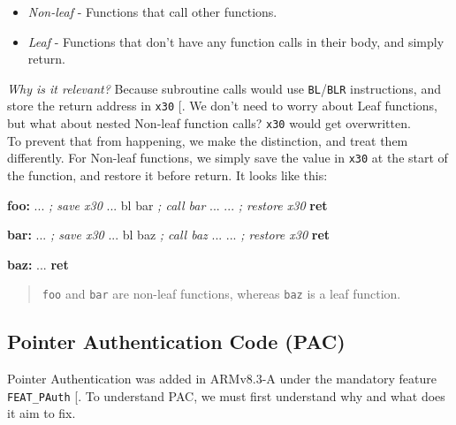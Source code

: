 \documentclass[a4paper, nobind]{templates/ociamthesis}
\providecommand{\tightlist}{%
  \setlength{\itemsep}{0pt}\setlength{\parskip}{0pt}}
\newenvironment{Shaded}{\begin{snugshade}}{\end{snugshade}}
\newcommand{\CommentTok}[1]{\textcolor[rgb]{0.56,0.35,0.01}{\textit{#1}}}
\newcommand{\ControlFlowTok}[1]{\textcolor[rgb]{0.13,0.29,0.53}{\textbf{#1}}}
\newcommand{\FunctionTok}[1]{\textcolor[rgb]{0.13,0.29,0.53}{\textbf{#1}}}
\newcommand{\NormalTok}[1]{#1}
\renewenvironment{Shaded}
{
  \vspace{10pt}%
  \begin{snugshade}%
}{%
  \end{snugshade}%
  \vspace{8pt}%
}
\begin{document}
\begin{itemize}
\tightlist
\item
  \emph{Non-leaf} - Functions that call other functions.
\item
  \emph{Leaf} - Functions that don't have any function calls in their body, and simply return.
\end{itemize}

\emph{Why is it relevant?}
Because subroutine calls would use \texttt{BL}/\texttt{BLR} instructions,
and store the return address in \texttt{x30} {[}\citeproc{ref-arm-arch-manual}{11}{]}.
We don't need to worry about Leaf functions,
but what about nested Non-leaf function calls? \texttt{x30} would get overwritten.\\
To prevent that from happening, we make the distinction, and treat them differently.
For Non-leaf functions, we simply save the value in \texttt{x30} at the start of the function,
and restore it before return. It looks like this:

\begin{Shaded}
\begin{Highlighting}[]
\FunctionTok{foo:}
\NormalTok{  ...     }\CommentTok{; save x30}
\NormalTok{  ...}
\NormalTok{  bl bar  }\CommentTok{; call bar}
\NormalTok{  ...}
\NormalTok{  ...     }\CommentTok{; restore x30}
  \ControlFlowTok{ret}

\FunctionTok{bar:}
\NormalTok{  ...     }\CommentTok{; save x30}
\NormalTok{  ...}
\NormalTok{  bl baz  }\CommentTok{; call baz}
\NormalTok{  ...}
\NormalTok{  ...     }\CommentTok{; restore x30}
  \ControlFlowTok{ret}

\FunctionTok{baz:}
\NormalTok{  ...}
  \ControlFlowTok{ret}
\end{Highlighting}
\end{Shaded}

\begin{quote}
\texttt{foo} and \texttt{bar} are non-leaf functions, whereas \texttt{baz} is a leaf function.
\end{quote}

\subsection{Pointer Authentication Code (PAC)}\label{pac-bg}

Pointer Authentication was added in ARMv8.3-A under the mandatory feature \texttt{FEAT\_PAuth} {[}\citeproc{ref-arm-feat-names}{13}{]}.
To understand PAC, we must first understand why and what does it aim to fix.
\end{document}
